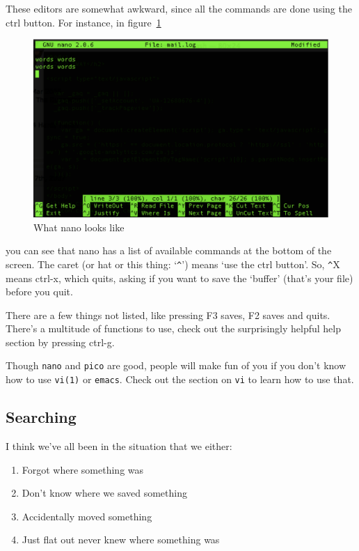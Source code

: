 These editors are somewhat awkward, since all the commands are done
using the ctrl button.  For instance, in figure~\ref{nano}
\begin{figure}
		\includegraphics[scale=0.6]{shell/nano.pdf} 
		\caption{What nano looks like}
		\label{nano}
\end{figure}
you can see that nano has a list of available commands at the bottom of the screen.  
The caret (or hat or this thing: `\verb|^|') means `use the ctrl button'.
So, \verb|^|X means ctrl-x, which quits, asking if you want to save the `buffer' 
(that's your file) before you quit.

There are a few things not listed, like pressing F3 saves, F2 saves and quits. 
There's a multitude of functions to use, check out the surprisingly helpful
help section by pressing ctrl-g.

Though {\tt nano} and {\tt pico} are good, people will make fun of you 
if you don't know how to use {\tt vi(1)} or {\tt emacs}.  Check out the section
on {\tt vi} to learn how to use that.

 
 


\subsection{Searching}
I think we've all been in the situation that we either:
\begin{enumerate}
\item Forgot where something was
\item Don't know where we saved something
\item Accidentally moved something
\item Just flat out never knew where something was
\end{enumerate}

